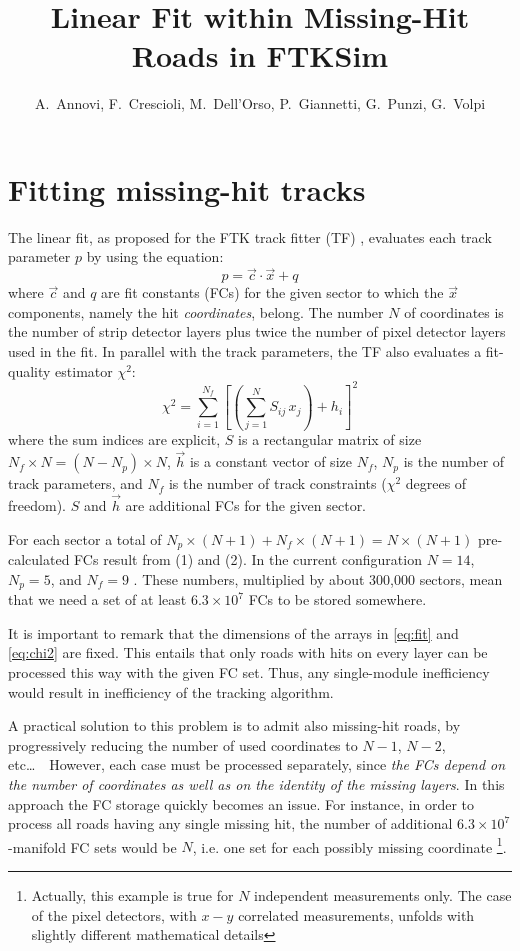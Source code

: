 \documentclass[a4paper,11pt]{article}
\title{Linear Fit within Missing-Hit Roads in FTKSim}
\author{A.~Annovi, F.~Crescioli, M.~Dell'Orso, P.~Giannetti, G.~Punzi, G.~Volpi}
\begin{document}
\maketitle

\section{Fitting missing-hit tracks}
\label{sec:idea}

The linear fit, as proposed for the FTK track fitter (TF) \cite{FTK-IEEE-1},
evaluates each track parameter $p$ by using the equation:
\begin{equation}
  \label{eq:fit}
  p = \vec c \cdot \vec x + q
\end{equation}
where $\vec c$ and $q$ are fit constants (FCs) for the given sector
\cite{SVT-TDR} 
to which the $\vec x$ components, namely the hit {\em coordinates}, belong.
The number $N$ of coordinates
is the number of strip detector layers plus twice the number of
pixel detector layers used in the fit.
In parallel with the track parameters,
the TF also evaluates a fit-quality estimator $\chi^2$:
\begin{equation}
  \label{eq:chi2}
  \chi^2 = \sum_{i=1}^{N_f} \left[ \left( \sum_{j=1}^N S_{ij} \, x_j \right) + h_i \right]^2
\end{equation}
where the sum indices are explicit,
$S$ is a rectangular matrix of size $N_f \times N = (N-N_p) \times N$,
$\vec h$ is a constant vector of size $N_f$,
$N_p$ is the number of track parameters,
and $N_f$ is the number of track constraints ($\chi^2$ degrees of freedom).
$S$ and $\vec h$ are additional FCs for the given sector.

For each sector a total of
$N_p \times (N+1) + N_f \times (N+1) = N \times (N+1)$
pre-calculated FCs result from (1) and (2).
In the current configuration $N=14$, $N_p=5$, and $N_f=9$
\cite{Brubaker:2007rk}. 
These numbers, multiplied by about 300,000 sectors, mean that we need
a set of at least $6.3 \times 10^7$ FCs to be stored somewhere.

It is important to remark that the dimensions of the arrays in
\eqref{eq:fit} and \eqref{eq:chi2} are fixed.
This entails that only roads with hits on every layer can be processed
this way with the given FC set.
Thus, any single-module inefficiency would result in inefficiency of the
tracking algorithm.

A practical solution to this problem is to admit also missing-hit roads,
by progressively reducing the number of used coordinates to
$N-1$, $N-2$, etc\ldots \ \ 
However, each case must be processed separately,
since {\em the FCs depend on the number of coordinates
as well as on the identity of the missing layers}.
In this approach the FC storage quickly becomes an issue.
For instance, in order to process all roads having any single missing hit,
the number of additional $6.3 \times 10^7$-manifold FC sets would be $N$, i.e. one set
for each possibly missing coordinate
\footnote{Actually, this example is true for $N$ independent
measurements only. The case of the pixel detectors, with $x-y$ correlated
measurements, unfolds with slightly different mathematical details}.
\end{document}
